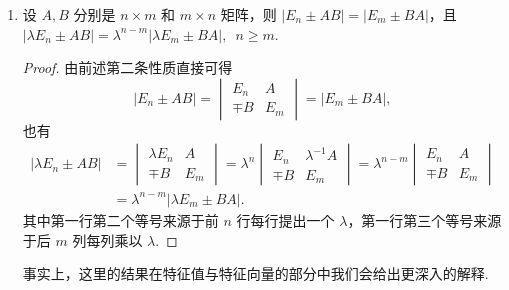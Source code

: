 \begin{enumerate}
\begin{proof}
              本条的其他结论推导类似于上方，在此不再赘述，感兴趣的读者可以自行推导（关键在于第三类分块初等矩阵行列式为1），实际上结论并不是很重要，重要的是在于领悟使用行列式分块计算性质和打洞法的基本方法.
          \end{proof}

          根据上面的结论，如果 $A$ 和 $D$ 均可逆，我们有 $|A||D-CA^{-1}B|=|D||A-BD^{-1}C|$，这一公式称为. 降阶公式的具体应用可以参考\autoref{ex:降阶公式的应用}.

          \item 设 $A,B$ 分别是 $n \times m$ 和 $m \times n$ 矩阵，则 $|E_n \pm AB|=|E_m \pm BA|$，且 \\
          $|\lambda E_n \pm AB|=\lambda^{n-m}|\lambda E_m \pm BA|,\enspace n \geqslant m$.
          \begin{proof}
              由前述第二条性质直接可得
              \[|E_n \pm AB|=\begin{vmatrix}
                      E_n & A \\ \mp B & E_m
                  \end{vmatrix}=|E_m \pm BA|,\]
              也有
              \begin{align*}
                  |\lambda E_n \pm AB|
                   & =\begin{vmatrix}
                          \lambda E_n & A \\ \mp B & E_m
                      \end{vmatrix}=\lambda^n
                  \begin{vmatrix}
                      E_n & \lambda^{-1}A \\ \mp B & E_m
                  \end{vmatrix}=\lambda^{n-m}\begin{vmatrix}
                                                 E_n & A \\ \mp B & E_m
                                             \end{vmatrix} \\
                   & = \lambda^{n-m}|\lambda E_m \pm BA|.
              \end{align*}
              其中第一行第二个等号来源于前 $n$ 行每行提出一个 $\lambda$，第一行第三个等号来源于后 $m$ 列每列乘以 $\lambda$.
          \end{proof}

          事实上，这里的结果在特征值与特征向量的部分中我们会给出更深入的解释.
\end{enumerate}


